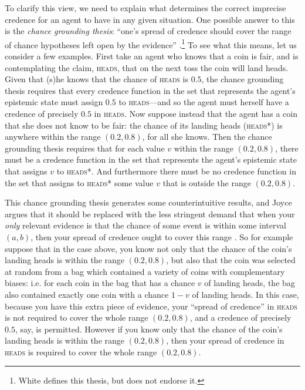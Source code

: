 To clarify this view, we need to explain what determines the correct imprecise credence for an agent to have in any given situation. One possible answer to this is the \textit{chance grounding thesis}: ``one's spread of credence should cover the range of chance hypotheses left open by the evidence'' \citep[p. 174]{White2009}.\footnote{White defines this thesis, but does not endorse it.} To see what this means, let us consider a few examples. First take an agent who knows that a coin is fair, and is contemplating the claim, \textsc{heads}, that on the next toss the coin will land heads. Given that (s)he knows that the chance of \textsc{heads} is $0.5$, the chance grounding thesis requires that every credence function in the set that represents the agent's epistemic state must assign $0.5$ to \textsc{heads}---and so the agent must herself have a credence of precisely $0.5$ in \textsc{heads}. Now suppose instead that the agent has a coin that she does not know to be fair: the chance of its landing heads (\textsc{heads}*) is anywhere within the range $(0.2, 0.8)$, for all she knows. Then the chance grounding thesis requires that for each value $v$ within the range $(0.2, 0.8)$, there must be a credence function in the set that represents the agent's epistemic state that assigns $v$ to \textsc{heads}*. And furthermore there must be no credence function in the set that assigns to \textsc{heads}* some value $v$ that is outside the range $(0.2, 0.8)$. 

This chance grounding thesis generates some counterintuitive results, and Joyce argues that it should be replaced with the less stringent demand that when your \emph{only} relevant evidence is that the chance of some event is within some interval $(a, b)$, then your spread of credence ought to cover this range \citep[p. 289]{Joyce2010}. So for example suppose that in the case above, you know not only that the chance of the coin's landing heads is within the range $(0.2, 0.8)$, but also that the coin was selected at random from a bag which contained a variety of coins with complementary biases: i.e. for each coin in the bag that has a chance $v$ of landing heads, the bag also contained exactly one coin with a chance $1-v$ of landing heads. In this case, because you have this extra piece of evidence, your ``spread of credence'' in \textsc{heads} is not required to cover the whole range $(0.2, 0.8)$, and a credence of precisely $0.5$, say, is permitted. However if you know only that the chance of the coin's landing heads is within the range $(0.2, 0.8)$, then your spread of credence in \textsc{heads} is required to cover the whole range $(0.2, 0.8)$. 

